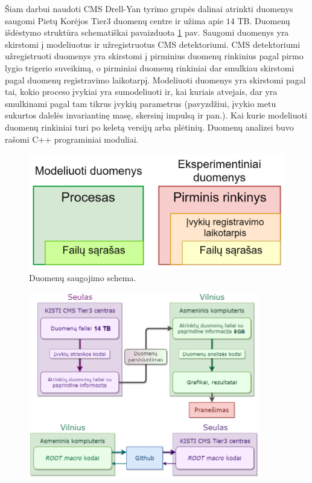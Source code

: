 \documentclass[a4paper, 12pt, oneside]{article}
\begin{document}
Šiam darbui naudoti CMS Drell-Yan tyrimo grupės dalinai atrinkti duomenys saugomi Pietų Korėjos Tier3 duomenų centre ir užima apie $14$ TB.
Duomenų išdėstymo struktūra schematiškai pavaizduota \ref{fig:duomSchem} pav.
Saugomi duomenys yra skirstomi į modeliuotus ir užregistruotus CMS detektoriumi.
CMS detektoriumi užregistruoti duomenys yra skirstomi į pirminius duomenų rinkinius pagal pirmo lygio trigerio
suveikimą, o pirminiai duomenų rinkiniai dar smulkiau skirstomi pagal duomenų registravimo laikotarpį.
Modeliuoti duomenys yra skirstomi pagal tai, kokio proceso įvykiai yra sumodeliuoti ir, kai kuriais atvejais,
dar yra smulkinami pagal tam tikrus įvykių parametrus (pavyzdžiui, įvykio metu sukurtos dalelės invariantinę masę,
skersinį impulsą ir pan.).
Kai kurie modeliuoti duomenų rinkiniai turi po keletą versijų arba plėtinių.
Duomenų analizei buvo rašomi C++ programiniai moduliai.

\begin{figure}[H]
	\includegraphics[width=\textwidth]{Duomenu_schema_DataMC_v2.png}
	\caption{\label{fig:duomSchem} Duomenų saugojimo schema.}
\end{figure}

\begin{figure}[H]
	\includegraphics[width=0.9\textwidth]{Duomenu_panaudojimo_schema.png}
\end{figure}
\end{document}
